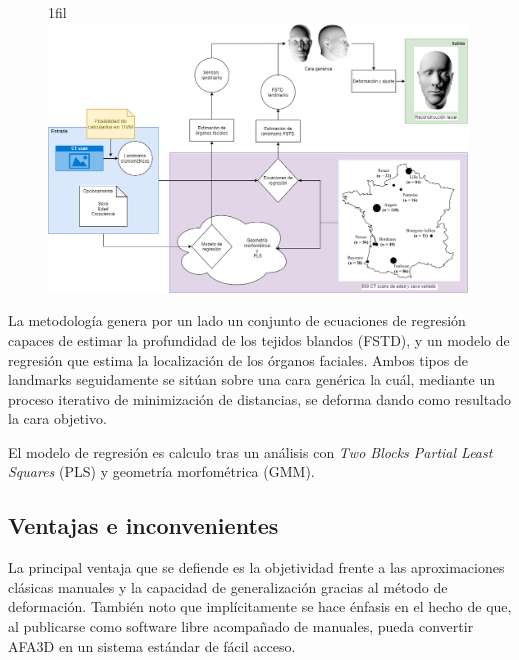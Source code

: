 \documentclass[13pt,a4paper]{article}
\makeatletter
\newcommand*{\centerfloat}{%
  \parindent \z@
  \leftskip \z@ \@plus 1fil \@minus \textwidth
  \rightskip\leftskip
  \parfillskip \z@skip}
\makeatother
\begin{document}


\begin{figure}[ht]
  \centerfloat
  \includegraphics[width=0.99\textwidth]{img/methodology.png}
\end{figure}

La metodología genera por un lado un conjunto de ecuaciones de regresión capaces de estimar la profundidad de los tejidos blandos (FSTD), y un modelo de regresión que estima la localización de los órganos faciales. Ambos tipos de landmarks seguidamente se sitúan sobre una cara genérica la cuál, mediante un proceso iterativo de minimización de distancias, se deforma dando como resultado la cara objetivo.

El modelo de regresión es calculo tras un análisis con \textit{Two Blocks Partial Least Squares}
(PLS) y geometría morfométrica (GMM).

\subsection{Ventajas e inconvenientes}

La principal ventaja que se defiende es la objetividad frente a las aproximaciones clásicas manuales y la capacidad de generalización gracias al método de deformación. También noto que implícitamente se hace énfasis en el hecho de que, al publicarse como software libre acompañado de manuales, pueda convertir AFA3D en un sistema estándar de fácil acceso.
\end{document}

